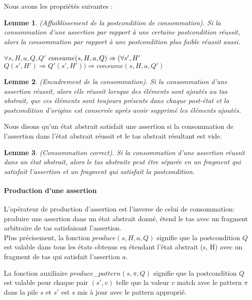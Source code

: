 \documentclass[11pt,openany]{article}
\newtheorem{lemme}{Lemme}
\begin{document}
	Nous avons les propri\'et\'es suivantes :	
	
	\begin{lemme}
		(Affaiblissement de la postcondition de consommation). Si la consommation d'une assertion par rapport \`a une certaine postcondition  r\'eussit, alors la consommation par rapport \`a une postcondition plus faible r\'eussit aussi.
		
$\forall s,H,a,Q,Q'$ $consume(s,H,a,Q)\Rightarrow\\(\forall s', H'$ $Q(s',H')\Rightarrow Q'(s',H'))\Rightarrow consume(s,H,a,Q')$
	\end{lemme}
	
	\begin{lemme}
		(Encadrement de la consommation). Si la consommation d'une assertion r\'eussit, alors elle r\'eussit lorsque des \'el\'ements sont ajout\'es au tas abstrait, que ces \'el\'ements sont toujours pr\'esents dans chaque post-\'etat et la postcondition d'origine est conserv\'ee apr\`es avoir supprim\'e les \'el\'ements ajout\'es.
	\end{lemme}
	Nous disons qu'un \'etat abstrait satisfait une assertion si la consommation de l'assertion dans l'\'etat abstrait r\'eussit et le tas abstrait r\'esultant est vide.\\
	
	\begin{lemme}
		(Consommation correct). Si la consommation d'une assertion r\'eussit dans un \'etat abstrait, alors le tas abstraite peut \^etre s\'epar\'ee en un fragment qui satisfait l'assertion et un fragment qui satisfait la postcondition.
	\end{lemme}
			\paragraph{Production d'une assertion}
		L'op\'erateur de production d'assertion est l'inverse de celui de consommation: produire une assertion dans un \'etat abstrait donn\'e, \'etend le tas avec un fragment arbitraire de tas satisfaisant l'assertion.\\
		Plus pr\'ecisement, la fonction $produce(s,H,a,Q)$ signifie que la postcondition $Q$ est valable  dans tous les \'etats obtenus en \'etendant l'\'etat abstrait (s, H) avec un fragment de tas qui satisfait l'assertion $a$.
		
		La fonction auxiliaire $produce$_$pattern(s,\pi,Q)$ signifie que la postcondition $Q$ est valable pour chaque pair $(s',v)$ telle que la valeur $v$ match avec le pattern $\pi$ dans la pile $s$ et $s'$ est $s$ mis \`a jour avec le pattern appropri\'e.
		
\end{document}
